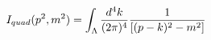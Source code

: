 \begin{equation}
I_{quad}(p^{2},m^{2})=\int_{\Lambda }\frac{d^{4}k}{(2\pi )^{4}}\frac{1}{%
[(p-k)^{2}-m^{2}]}
\end{equation}

